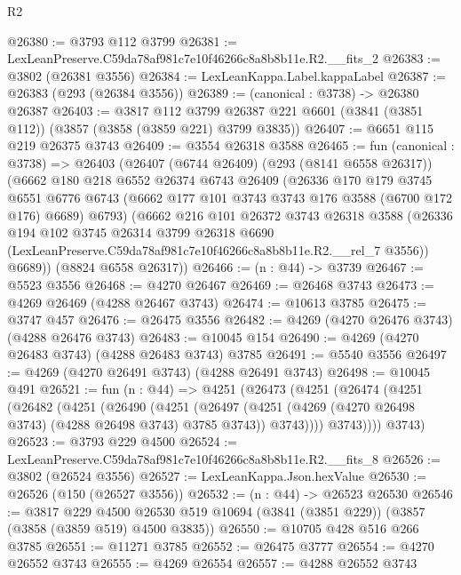 \begin{lexlean}{R2}
\begin{coremodule}
@26380 := @3793 @112 @3799
@26381 := LexLeanPreserve.C59da78af981c7e10f46266c8a8b8b11e.R2.__fits_2
@26383 := @3802 (@26381 @3556)
@26384 := LexLeanKappa.Label.kappaLabel
@26387 := @26383 (@293 (@26384 @3556))
@26389 := (canonical : @3738) -> @26380 @26387
@26403 := @3817
    @112
    @3799
    @26387
    @221
    @6601
    (@3841 (@3851 @112))
    (@3857 (@3858 (@3859 @221) @3799 @3835))
@26407 := @6651 @115 @219 @26375 @3743
@26409 := @3554 @26318 @3588
@26465 := fun (canonical : @3738) =>
  @26403
    (@26407
      (@6744 @26409)
      (@293 (@8141 @6558 @26317))
      (@6662
        @180
        @218
        @6552
        @26374
        @6743
        @26409
        (@26336
          @170
          @179
          @3745
          @6551
          @6776
          @6743
          (@6662 @177 @101 @3743 @3743 @176 @3588 (@6700 @172 @176) @6689)
          @6793)
        (@6662
          @216
          @101
          @26372
          @3743
          @26318
          @3588
          (@26336
            @194
            @102
            @3745
            @26314
            @3799
            @26318
            @6690
            (LexLeanPreserve.C59da78af981c7e10f46266c8a8b8b11e.R2.__rel_7 @3556))
          @6689))
      (@8824 @6558 @26317))
@26466 := (n : @44) -> @3739
@26467 := @5523 @3556
@26468 := @4270 @26467
@26469 := @26468 @3743
@26473 := @4269 @26469 (@4288 @26467 @3743)
@26474 := @10613 @3785
@26475 := @3747 @457
@26476 := @26475 @3556
@26482 := @4269 (@4270 @26476 @3743) (@4288 @26476 @3743)
@26483 := @10045 @154
@26490 := @4269 (@4270 @26483 @3743) (@4288 @26483 @3743) @3785
@26491 := @5540 @3556
@26497 := @4269 (@4270 @26491 @3743) (@4288 @26491 @3743)
@26498 := @10045 @491
@26521 := fun (n : @44) =>
  @4251
    (@26473
      (@4251
        (@26474
          (@4251
            (@26482
              (@4251
                (@26490
                  (@4251
                    (@26497
                      (@4251 (@4269 (@4270 @26498 @3743) (@4288 @26498 @3743) @3785 @3743))
                      @3743))))
              @3743))))
      @3743)
@26523 := @3793 @229 @4500
@26524 := LexLeanPreserve.C59da78af981c7e10f46266c8a8b8b11e.R2.__fits_8
@26526 := @3802 (@26524 @3556)
@26527 := LexLeanKappa.Json.hexValue
@26530 := @26526 (@150 (@26527 @3556))
@26532 := (n : @44) -> @26523 @26530
@26546 := @3817
    @229
    @4500
    @26530
    @519
    @10694
    (@3841 (@3851 @229))
    (@3857 (@3858 (@3859 @519) @4500 @3835))
@26550 := @10705 @428 @516 @266 @3785
@26551 := @11271 @3785
@26552 := @26475 @3777
@26554 := @4270 @26552 @3743
@26555 := @4269 @26554
@26557 := @4288 @26552 @3743

\end{coremodule}
\end{lexlean}
